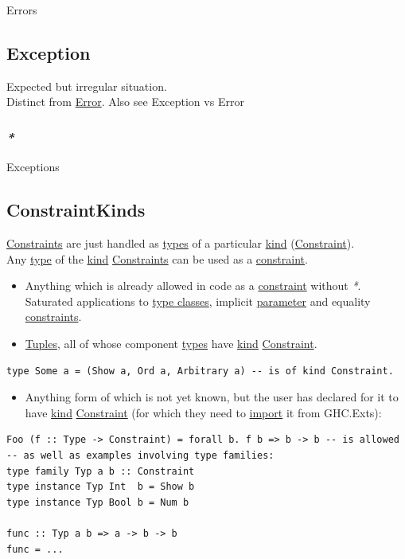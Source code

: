 \documentclass[11pt]{article}
\begin{document}
\label{orgaf8d923}Errors\\

\subsection{\label{org15cd20b}Exception}
\label{sec:org78ae32c}
Expected but irregular situation.\\

Distinct from \hyperref[orgb69b647]{Error}. Also see \label{orgdbf9483}Exception vs Error\\

\subsubsection{\emph{*}}
\label{sec:orgbd4ef1c}

\label{org24c6d87}Exceptions\\

\subsection{\label{orgc8a9924}ConstraintKinds}
\label{sec:orgc322deb}
\hyperref[org76311a9]{Constraints} are just handled as \hyperref[org3927fd9]{types} of a particular \hyperref[org19ec4cb]{kind} (\hyperref[org7bec652]{Constraint}).\\
Any \hyperref[org4fbaeb8]{type} of the \hyperref[org19ec4cb]{kind} \hyperref[org76311a9]{Constraints} can be used as a \hyperref[org7bec652]{constraint}.\\
\begin{itemize}
\item Anything which is already allowed in code as a \hyperref[org7bec652]{constraint} without \emph{*}. Saturated applications to \hyperref[org2efac60]{type classes}, implicit \hyperref[org45d4a16]{parameter} and equality \hyperref[org76311a9]{constraints}.\\
\item \hyperref[org9504f5c]{Tuples}, all of whose component \hyperref[org3927fd9]{types} have \hyperref[org19ec4cb]{kind} \hyperref[org7bec652]{Constraint}.\\
\end{itemize}
\begin{verbatim}
type Some a = (Show a, Ord a, Arbitrary a) -- is of kind Constraint.
\end{verbatim}
\begin{itemize}
\item Anything form of which is not yet known, but the user has declared for it to have \hyperref[org19ec4cb]{kind} \hyperref[org7bec652]{Constraint} (for which they need to \hyperref[org7d67aa0]{import} it from GHC.Exts):\\
\end{itemize}
\begin{verbatim}
Foo (f :: Type -> Constraint) = forall b. f b => b -> b -- is allowed
-- as well as examples involving type families:
type family Typ a b :: Constraint
type instance Typ Int  b = Show b
type instance Typ Bool b = Num b

func :: Typ a b => a -> b -> b
func = ...
\end{verbatim}
\end{document}
